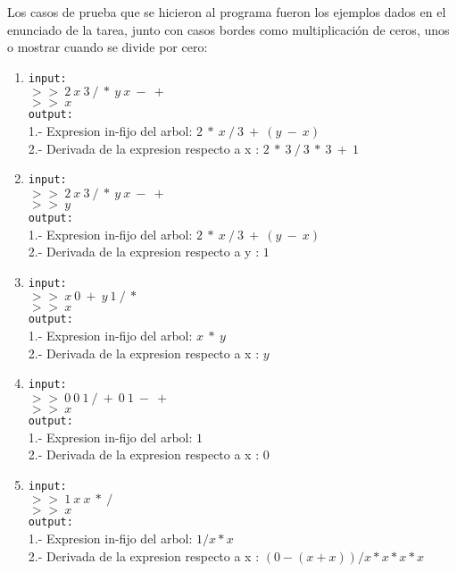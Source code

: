 \documentclass[letterpaper,11pt]{article} %
\begin{document}
{\small{}}
Los casos de prueba que se hicieron al programa fueron los ejemplos dados en el enunciado de la tarea, junto con casos bordes como multiplicación de ceros, unos o mostrar cuando se divide por cero:
\begin{enumerate}
\item \texttt{input: }\\
$> >\ 2\ x\ 3\ /\ *\ y\ x\ -\ +$\\
$> >\ x$\\
\texttt{output: }\\
1.-  Expresion in-fijo del arbol: $2\ *\ x\ /\ 3\ + \ (y\ -\ x)$ \\
2.-  Derivada de la expresion respecto a x : $2\ *\ 3\ /\ 3\ *\ 3\ +\ 1$\\
\item \texttt{input: }\\
$> >\ 2\ x\ 3\ /\ *\ y\ x\ -\ +$\\
$> >\ y$\\
\texttt{output: }\\
1.-  Expresion in-fijo del arbol: $2\ *\ x\ /\ 3\ + \ (y\ -\ x)$\\
2.-  Derivada de la expresion respecto a y : $1$\\
\item \texttt{input: }\\
$> >\ x\ 0\ +\ y\ 1\ /\ *$\\
$> >\ x$\\
\texttt{output: }\\
1.-  Expresion in-fijo del arbol: $x\ *\ y$\\
2.-  Derivada de la expresion respecto a x : $y$\\
\item \texttt{input: }\\
$> >\ 0\ 0\ 1\ /\ +\ 0\ 1\ -\ +$\\
$> >\ x$\\
\texttt{output: }\\
1.-  Expresion in-fijo del arbol: $1$\\
2.-  Derivada de la expresion respecto a x : $0$
\item \texttt{input: }\\
$> >\ 1\ x\ x\ *\ /$\\
$> >\ x$\\
\texttt{output: }\\
1.-  Expresion in-fijo del arbol: $1 / x * x$\\
2.-  Derivada de la expresion respecto a x : $(0 - (x + x)) / x * x * x * x$
\end{enumerate}
\end{document}
